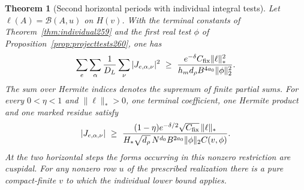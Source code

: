 \documentclass[a4paper,11pt]{article}
\newtheorem{theorem}[proposition]{Theorem}
\theoremstyle{definition}
\theoremstyle{remark}
\numberwithin{equation}{section}
\begin{document}
\begin{theorem}[Second horizontal periods with individual integral tests]\leavevmode
\label{thm:secondbound260}
Let \(\ell(A)=\mathcal B(A,u)\) on \(H(v)\).
With the terminal constants of Theorem~\ref{thm:individual259}
and the first real test \(\phi\) of
Proposition~\ref{prop:projecttests260}, one has
\[
 \sum_e\sum_\alpha\frac{1}{D_L}\sum_\nu |J_{e,\alpha,\nu}|^2
 \ \ge\ \frac{e^{-\delta}C_{\rm fix}\|\ell\|_*^2}
               {h_m d_\rho B^{4a_0}\|\phi\|_2^2}.
\]
The sum over Hermite indices denotes the supremum of finite
partial sums. For every \(0<\eta<1\) and \(\|\ell\|_*>0\), one
terminal coefficient, one Hermite product and one marked
residue satisfy
\[
 |J_{e,\alpha,\nu}|\ \ge\
 \frac{(1-\eta)e^{-\delta/2}\sqrt{C_{\rm fix}}\,\|\ell\|_*}
 {H_*\sqrt{d_\rho}\,N^{d_0}B^{2a_0}\|\phi\|_2 C(v,\phi)}.
\]
At the two horizontal steps the forms occurring in this
nonzero restriction are cuspidal. For any nonzero row \(u\)
of the prescribed realization there is a pure compact-finite
\(v\) to which the individual lower bound applies.
\end{theorem}
\end{document}

